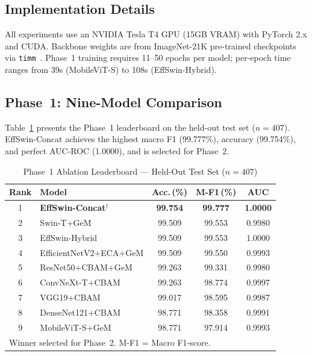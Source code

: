 \documentclass[conference]{IEEEtran}
\begin{document}
\subsection{Implementation Details}
All experiments use an NVIDIA Tesla T4 GPU (15GB VRAM) with PyTorch 2.x and CUDA. Backbone weights are from ImageNet-21K pre-trained checkpoints via \texttt{timm}~\cite{b23}. Phase~1 training requires 11--50 epochs per model; per-epoch time ranges from 39s (MobileViT-S) to 108s (EffSwin-Hybrid).

\subsection{Phase~1: Nine-Model Comparison}
Table~\ref{tab:ablation9} presents the Phase~1 leaderboard on the held-out test set ($n{=}407$). EffSwin-Concat achieves the highest macro F1 (99.777\%), accuracy (99.754\%), and perfect AUC-ROC (1.0000), and is selected for Phase~2.

\begin{table}[htbp]
\caption{Phase~1 Ablation Leaderboard --- Held-Out Test Set ($n{=}407$)}
\begin{center}
\begin{tabular}{clccc}
\toprule
\textbf{Rank} & \textbf{Model} & \textbf{Acc.\,(\%)} & \textbf{M-F1\,(\%)} & \textbf{AUC} \\
\midrule
1 & \textbf{EffSwin-Concat}$^\dagger$ & \textbf{99.754} & \textbf{99.777} & \textbf{1.0000} \\
2 & Swin-T+GeM          & 99.509 & 99.553 & 0.9980 \\
3 & EffSwin-Hybrid       & 99.509 & 99.553 & 1.0000 \\
4 & EfficientNetV2+ECA+GeM & 99.509 & 99.550 & 0.9993 \\
5 & ResNet50+CBAM+GeM   & 99.263 & 99.331 & 0.9980 \\
6 & ConvNeXt-T+CBAM     & 99.263 & 98.774 & 0.9997 \\
7 & VGG19+CBAM          & 99.017 & 98.595 & 0.9987 \\
8 & DenseNet121+CBAM    & 98.771 & 98.358 & 0.9991 \\
9 & MobileViT-S+GeM     & 98.771 & 97.914 & 0.9993 \\
\bottomrule
\multicolumn{5}{l}{\small Winner selected for Phase~2. M-F1 = Macro F1-score.}
\end{tabular}
\label{tab:ablation9}
\end{center}
\end{table}
\end{document}
